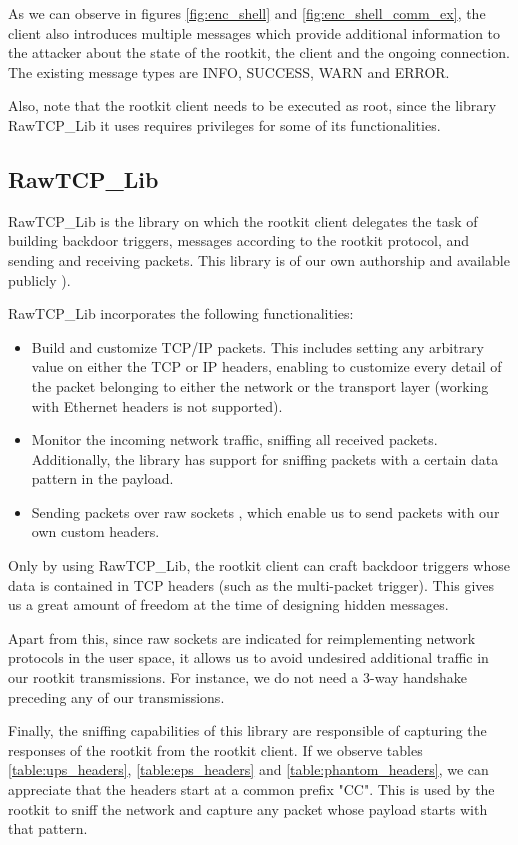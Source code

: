 As we can observe in figures \ref{fig:enc_shell} and \ref{fig:enc_shell_comm_ex}, the client also introduces multiple messages which provide additional information to the attacker about the state of the rootkit, the client and the ongoing connection. The existing message types are INFO, SUCCESS, WARN and ERROR.

Also, note that the rootkit client needs to be executed as root, since the library RawTCP\_Lib it uses requires privileges for some of its functionalities. 


\subsection{RawTCP\_Lib} \label{subsection:rawtcplib}
RawTCP\_Lib is the library on which the rootkit client delegates the task of building backdoor triggers, messages according to the rootkit protocol, and sending and receiving packets. This library is of our own authorship and available publicly \cite{rawtcp_lib}).

RawTCP\_Lib incorporates the following functionalities:
\begin{itemize}
\item Build and customize TCP/IP packets. This includes setting any arbitrary value on either the TCP or IP headers, enabling to customize every detail of the packet belonging to either the network or the transport layer (working with Ethernet headers is not supported).
\item Monitor the incoming network traffic, sniffing all received packets. Additionally, the library has support for sniffing packets with a certain data pattern in the payload.
\item Sending packets over raw sockets \cite{raw_sockets}, which enable us to send packets with our own custom headers.
\end{itemize}

Only by using RawTCP\_Lib, the rootkit client can craft backdoor triggers whose data is contained in TCP headers (such as the multi-packet trigger). This gives us a great amount of freedom at the time of designing hidden messages. 

Apart from this, since raw sockets are indicated for reimplementing network protocols in the user space, it allows us to avoid undesired additional traffic in our rootkit transmissions. For instance, we do not need a 3-way handshake preceding any of our transmissions.

Finally, the sniffing capabilities of this library are responsible of capturing the responses of the rootkit from the rootkit client. If we observe tables \ref{table:ups_headers}, \ref{table:eps_headers} and \ref{table:phantom_headers}, we can appreciate that the headers start at a common prefix "CC". This is used by the rootkit to sniff the network and capture any packet whose payload starts with that pattern.



